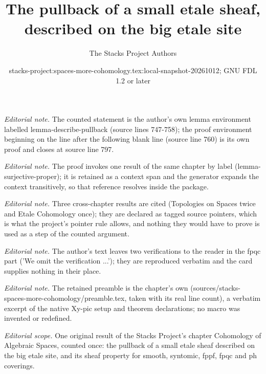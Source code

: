 \documentclass{stacks-project}
\title{The pullback of a small etale sheaf, described on the big etale site}
\author{The Stacks Project Authors}
\date{stacks-project:spaces-more-cohomology.tex:local-snapshot-20261012; GNU FDL 1.2 or later}
\theoremstyle{plain}
\theoremstyle{definition}
\theoremstyle{remark}
\numberwithin{equation}{subsection}
\begin{document}
\maketitle
\noindent\textit{Editorial note.} The counted statement is the author's own lemma environment labelled lemma-describe-pullback (source lines 747-758); the proof environment beginning on the line after the following blank line (source line 760) is its own proof and closes at source line 797.\par\medskip
\noindent\textit{Editorial note.} The proof invokes one result of the same chapter by label (lemma-surjective-proper); it is retained as a context span and the generator expands the context transitively, so that reference resolves inside the package.\par\medskip
\noindent\textit{Editorial note.} Three cross-chapter results are cited (Topologies on Spaces twice and Etale Cohomology once); they are declared as tagged source pointers, which is what the project's pointer rule allows, and nothing they would have to prove is used as a step of the counted argument.\par\medskip
\noindent\textit{Editorial note.} The author's text leaves two verifications to the reader in the fpqc part ('We omit the verification ...'); they are reproduced verbatim and the card supplies nothing in their place.\par\medskip
\noindent\textit{Editorial note.} The retained preamble is the chapter's own (sources/stacks-spaces-more-cohomology/preamble.tex, taken with its real line count), a verbatim excerpt of the native Xy-pic setup and theorem declarations; no macro was invented or redefined.\par\medskip
\noindent\textit{Editorial scope.} One original result of the Stacks Project's chapter Cohomology of Algebraic Spaces, counted once: the pullback of a small etale sheaf described on the big etale site, and its sheaf property for smooth, syntomic, fppf, fpqc and ph coverings.\par\medskip
\end{document}
